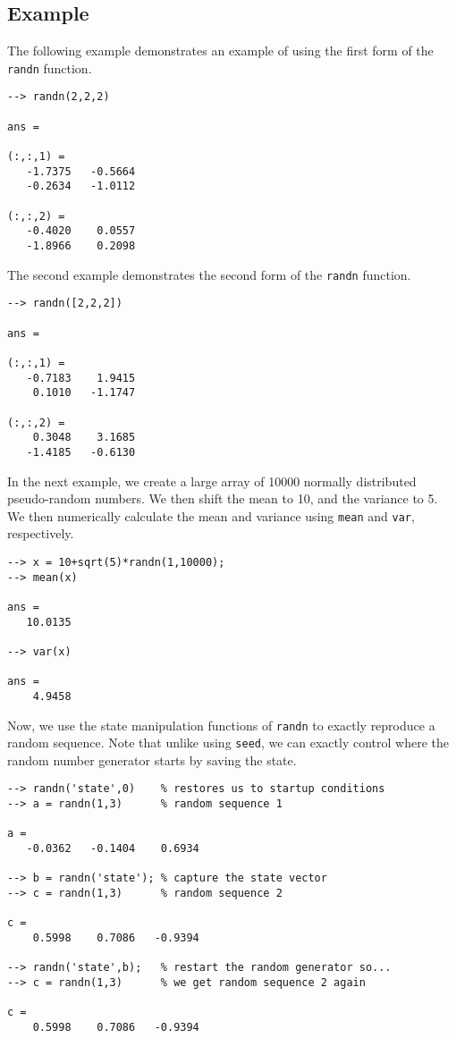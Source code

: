 \subsection{Example}

The following example demonstrates an example of using the first form of the \verb|randn| function.
\begin{verbatim}
--> randn(2,2,2)

ans = 

(:,:,1) = 
   -1.7375   -0.5664 
   -0.2634   -1.0112 

(:,:,2) = 
   -0.4020    0.0557 
   -1.8966    0.2098 
\end{verbatim}
The second example demonstrates the second form of the \verb|randn| function.
\begin{verbatim}
--> randn([2,2,2])

ans = 

(:,:,1) = 
   -0.7183    1.9415 
    0.1010   -1.1747 

(:,:,2) = 
    0.3048    3.1685 
   -1.4185   -0.6130 
\end{verbatim}
In the next example, we create a large array of 10000  normally distributed pseudo-random numbers.  We then shift the mean to 10, and the variance to 5.  We then numerically calculate the mean and variance using \verb|mean| and \verb|var|, respectively.
\begin{verbatim}
--> x = 10+sqrt(5)*randn(1,10000);
--> mean(x)

ans = 
   10.0135 

--> var(x)

ans = 
    4.9458 
\end{verbatim}
Now, we use the state manipulation functions of \verb|randn| to exactly reproduce 
a random sequence.  Note that unlike using \verb|seed|, we can exactly control where
the random number generator starts by saving the state.
\begin{verbatim}
--> randn('state',0)    % restores us to startup conditions
--> a = randn(1,3)      % random sequence 1

a = 
   -0.0362   -0.1404    0.6934 

--> b = randn('state'); % capture the state vector
--> c = randn(1,3)      % random sequence 2  

c = 
    0.5998    0.7086   -0.9394 

--> randn('state',b);   % restart the random generator so...
--> c = randn(1,3)      % we get random sequence 2 again

c = 
    0.5998    0.7086   -0.9394 
\end{verbatim}
